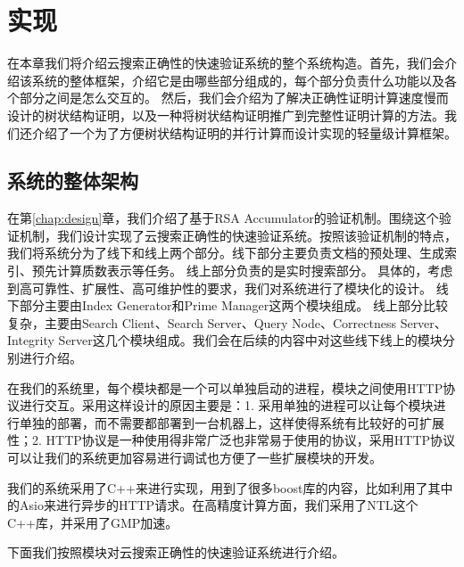 \chapter{实现}
\label{chap:implementation}

在本章我们将介绍云搜索正确性的快速验证系统的整个系统构造。首先，我们会介绍该系统的整体框架，介绍它是由哪些部分组成的，每个部分负责什么功能以及各个部分之间是怎么交互的。
然后，我们会介绍为了解决正确性证明计算速度慢而设计的树状结构证明，以及一种将树状结构证明推广到完整性证明计算的方法。我们还介绍了一个为了方便树状结构证明的并行计算而设计实现的轻量级计算框架。

\section{系统的整体架构}

在第\ref{chap:design}章，我们介绍了基于RSA Accumulator的验证机制。围绕这个验证机制，我们设计实现了云搜索正确性的快速验证系统。按照该验证机制的特点，
我们将系统分为了线下和线上两个部分。线下部分主要负责文档的预处理、生成索引、预先计算质数表示等任务。
线上部分负责的是实时搜索部分。
具体的，考虑到高可靠性、扩展性、高可维护性的要求，我们对系统进行了模块化的设计。
线下部分主要由Index Generator和Prime Manager这两个模块组成。
线上部分比较复杂，主要由Search Client、Search Server、Query Node、Correctness Server、Integrity Server这几个模块组成。我们会在后续的内容中对这些线下线上的模块分别进行介绍。

在我们的系统里，每个模块都是一个可以单独启动的进程，模块之间使用HTTP协议进行交互。采用这样设计的原因主要是：1. 采用单独的进程可以让每个模块进行单独的部署，而不需要都部署到一台机器上，这样使得系统有比较好的可扩展性；2. HTTP协议是一种使用得非常广泛也非常易于使用的协议，采用HTTP协议可以让我们的系统更加容易进行调试也方便了一些扩展模块的开发。

我们的系统采用了C++来进行实现，用到了很多boost库的内容，比如利用了其中的Asio来进行异步的HTTP请求。在高精度计算方面，我们采用了NTL这个C++库，并采用了GMP加速。

下面我们按照模块对云搜索正确性的快速验证系统进行介绍。


